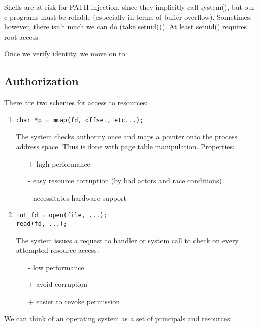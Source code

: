 \documentclass[../../lecture_notes.tex]{subfiles}
\begin{document}
Shells are at risk for PATH injection, since they implicitly call system(), but our c programs must be reliable (especially in terms of buffer overflow). Sometimes, however, there isn’t much we can do (take setuid()). At least setuid() requires root access

Once we verify identity, we move on to:

\subsection{Authorization}

There are two schemes for access to resources:
\begin{enumerate}
\item {}
\begin{lstlisting}
char *p = mmap(fd, offset, etc...);
\end{lstlisting}
	The system checks authority once and maps a pointer onto the process address space. Thus is done with page table manipulation.
	Properties: \begin{enumerate}[nosep]
		\item[+] high performance
		\item[-] easy resource corruption (by bad actors and race conditions)
		\item[-] necessitates hardware support
	\end{enumerate}

\item {}
\begin{lstlisting}
int fd = open(file, ...);
read(fd, ...);
\end{lstlisting}
The system issues a request to handler or system call to check on every attempted resource access.
\begin{enumerate}[nosep]
\item[-] low performance
\item[+] avoid corruption
\item[+] easier to revoke permission
\end{enumerate}
\end{enumerate}

We can think of an operating system as a set of principals and resources:
\end{document}
